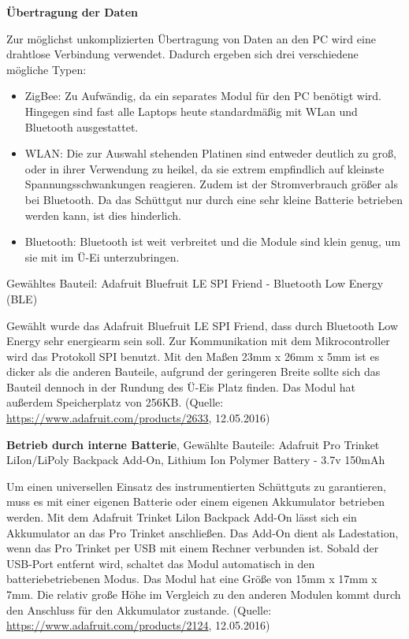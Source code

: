 \textbf{Übertragung der Daten}

Zur möglichst unkomplizierten Übertragung von Daten an den PC wird eine drahtlose Verbindung verwendet. Dadurch ergeben sich drei verschiedene mögliche Typen:
\begin{itemize}
	\item ZigBee: Zu Aufwändig, da ein separates Modul für den PC benötigt wird. Hingegen sind fast alle Laptops heute standardmäßig mit WLan und Bluetooth ausgestattet.
	\item WLAN: Die zur Auswahl stehenden Platinen sind entweder deutlich zu groß, oder in ihrer Verwendung zu heikel, da sie extrem empfindlich auf kleinste Spannungsschwankungen reagieren. Zudem ist der Stromverbrauch größer als bei Bluetooth. Da das Schüttgut nur durch eine sehr kleine Batterie betrieben werden kann, ist dies hinderlich.
	\item Bluetooth: Bluetooth ist weit verbreitet und die Module sind klein genug, um sie mit im Ü-Ei unterzubringen.
\end{itemize}

Gewähltes Bauteil: Adafruit Bluefruit LE SPI Friend - Bluetooth Low Energy (BLE)

Gewählt wurde das Adafruit Bluefruit LE SPI Friend, dass durch Bluetooth Low Energy sehr energiearm sein soll. Zur Kommunikation mit dem Mikrocontroller wird das Protokoll SPI benutzt. Mit den Maßen 23mm x 26mm x 5mm ist es dicker als die anderen Bauteile, aufgrund der geringeren Breite sollte sich das Bauteil dennoch in der Rundung des Ü-Eis Platz finden. Das Modul hat außerdem Speicherplatz von 256KB. (Quelle: \url{https://www.adafruit.com/products/2633}, 12.05.2016)

\textbf{Betrieb durch interne Batterie}, Gewählte Bauteile: Adafruit Pro Trinket LiIon/LiPoly Backpack Add-On, Lithium Ion Polymer Battery - 3.7v 150mAh

Um einen universellen Einsatz des instrumentierten Schüttguts zu garantieren, muss es mit einer eigenen Batterie oder einem eigenen Akkumulator betrieben werden. 
Mit dem Adafruit Trinket Lilon Backpack Add-On lässt sich ein Akkumulator an das Pro Trinket anschließen. Das Add-On dient als Ladestation, wenn das Pro Trinket per USB mit einem Rechner verbunden ist. Sobald der USB-Port entfernt wird, schaltet das Modul automatisch in den batteriebetriebenen Modus. Das Modul hat eine Größe von 15mm x 17mm x 7mm. Die relativ große Höhe im Vergleich zu den anderen Modulen kommt durch den Anschluss für den Akkumulator zustande. (Quelle: \url{https://www.adafruit.com/products/2124}, 12.05.2016)

